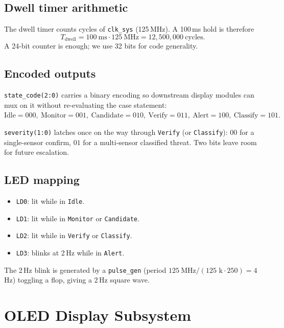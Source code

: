 \documentclass[11pt,a4paper]{article}
\begin{document}
\subsection{Dwell timer arithmetic}

The dwell timer counts cycles of \texttt{clk\_sys} (125\,MHz).  A
100\,ms hold is therefore
\[
  T_{\text{dwell}} = 100~\text{ms} \cdot 125~\text{MHz}
                   = 12{,}500{,}000~\text{cycles}.
\]
A 24-bit counter is enough; we use 32 bits for code generality.

\subsection{Encoded outputs}

\texttt{state\_code(2:0)} carries a binary encoding so downstream
display modules can mux on it without re-evaluating the case statement:
\(
\text{Idle}{=}000,~\text{Monitor}{=}001,~\text{Candidate}{=}010,~\text{Verify}{=}011,~\text{Alert}{=}100,~\text{Classify}{=}101.
\)

\texttt{severity(1:0)} latches once on the way through \texttt{Verify}
(or \texttt{Classify}): \(00\) for a single-sensor confirm, \(01\) for a
multi-sensor classified threat.  Two bits leave room for future
escalation.

\subsection{LED mapping}

\begin{itemize}
  \item \texttt{LD0}: lit while in \texttt{Idle}.
  \item \texttt{LD1}: lit while in \texttt{Monitor} or \texttt{Candidate}.
  \item \texttt{LD2}: lit while in \texttt{Verify} or \texttt{Classify}.
  \item \texttt{LD3}: blinks at 2\,Hz while in \texttt{Alert}.
\end{itemize}

The 2\,Hz blink is generated by a \texttt{pulse\_gen} (period
$125~\text{MHz}/(125\text{ k} \cdot 250) = 4$\,Hz) toggling a flop, giving
a 2\,Hz square wave.

\section{OLED Display Subsystem}
\end{document}
